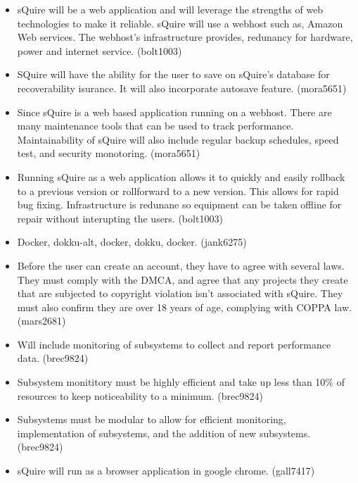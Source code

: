 \documentclass[11pt]{report}
\begin{document}
\begin{itemize}
            \item sQuire will be a web application and will leverage the strengths of web technologies to make it reliable.       sQuire will use a webhost such as, Amazon Web services. The webhost's infrastructure provides, redunancy for hardware, power and internet service. (bolt1003)
            \item SQuire will have the ability for the user to save on sQuire's database for recoverability isurance. It will also incorporate autosave feature. (mora5651)
            \item Since sQuire is a web based application running on a webhost. There are 
            many maintenance tools that can be used to track performance. Maintainability of sQuire will also include regular backup schedules, speed test, and security monotoring. (mora5651)
            \item Running sQuire as a web application allows it to quickly and easily rollback to a previous version or rollforward to a new version. This allows for rapid bug fixing. Infrastructure is redunane so equipment can be taken offline for repair without interupting the users. (bolt1003)
            \item Docker, dokku-alt, docker, dokku, docker. (jank6275)
            \item Before the user can create an account, they have to agree with several laws. They must comply with the DMCA, and agree that any projects they create that are subjected to copyright violation isn’t associated with sQuire. They must also confirm they are over 18 years of age, complying with COPPA law. (mars2681)
            \item Will include monitoring of subsystems to collect and report performance data. (brec9824)
            \item Subsystem monititory must be highly efficient and take up less than 10\% of resources to keep noticeability to a minimum. (brec9824)
            \item Subsystems must be modular to allow for efficient monitoring, implementation of subsystems, and the addition of new subsystems. (brec9824)
            \item sQuire will run as a browser application in google chrome. (gall7417)

\end{itemize}
\end{document}
